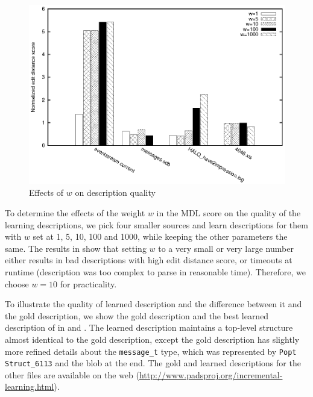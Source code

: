 \begin{figure}[th]
\centering
\includegraphics[width=\columnwidth]{adc}
\caption{Effects of $w$ on description quality}
\label{fig:adc}
\end{figure}

To determine the effects of the weight $w$ in the MDL score on the quality
of the learning descriptions, we pick four smaller sources and learn
descriptions for them with $w$ set at 1, 5, 10, 100 and 1000, while
keeping the other parameters the same. The results in 
show that setting $w$ to a very small or very large number either
results in bad descriptions with high edit distance score, or
timeouts at runtime (description was too complex to parse in reasonable time).
Therefore, we choose $w = 10$ for practicality.

To illustrate the quality of learned description and the difference between it
and the gold description, we show the gold description and the best
learned description of  in 
and . The learned description maintains a top-level
structure almost identical to the gold description, except the gold description
has slightly more refined details about the {\tt message\_t} type, which was
represented by {\tt Popt Struct\_6113} and the blob at the end.  The gold and learned descriptions 
for the other files are available on the web (\url{http://www.padsproj.org/incremental-learning.html}).

